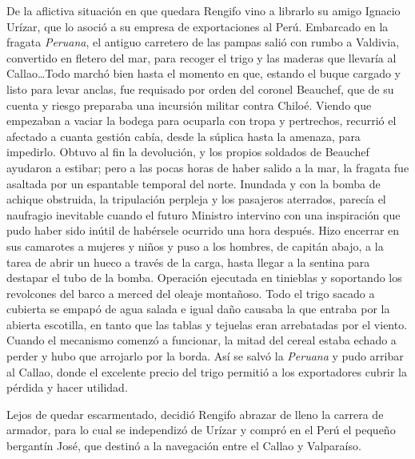 \documentclass[10pt,twoside,openright]{memoir}
\begin{document}
De la aflictiva situación en que quedara Rengifo vino a librarlo su
amigo Ignacio Urízar, que lo asoció a su empresa de exportaciones al
Perú. Embarcado en la fragata \emph{Peruana}, el antiguo carretero de
las pampas salió con rumbo a Valdivia, convertido en fletero del mar,
para recoger el trigo y las maderas que llevaría al Callao\ldots Todo
marchó bien hasta el momento en que, estando el buque cargado y listo
para levar anclas, fue requisado por orden del coronel Beauchef, que de
su cuenta y riesgo preparaba una incursión militar contra Chiloé. Viendo
que empezaban a vaciar la bodega para ocuparla con tropa y pertrechos,
recurrió el afectado a cuanta gestión cabía, desde la súplica hasta la
amenaza, para impedirlo. Obtuvo al fin la devolución, y los propios
soldados de Beauchef ayudaron a estibar; pero a las pocas horas de haber
salido a la mar, la fragata fue asaltada por un espantable temporal del
norte. Inundada y con la bomba de achique obstruida, la tripulación
perpleja y los pasajeros aterrados, parecía el naufragio inevitable
cuando el futuro Ministro intervino con una inspiración que pudo haber
sido inútil de habérsele ocurrido una hora después. Hizo encerrar en sus
camarotes a mujeres y niños y puso a los hombres, de capitán abajo, a la
tarea de abrir un hueco a través de la carga, hasta llegar a la sentina
para destapar el tubo de la bomba. Operación ejecutada en tinieblas y
soportando los revolcones del barco a merced del oleaje montañoso. Todo
el trigo sacado a cubierta se empapó de agua salada e igual daño causaba
la que entraba por la abierta escotilla, en tanto que las tablas y
tejuelas eran arrebatadas por el viento. Cuando el mecanismo comenzó a
funcionar, la mitad del cereal estaba echado a perder y hubo que
arrojarlo por la borda. Así se salvó la \emph{Peruana} y pudo arribar al
Callao, donde el excelente precio del trigo permitió a los exportadores
cubrir la pérdida y hacer utilidad.

Lejos de quedar escarmentado, decidió Rengifo abrazar de lleno la
carrera de armador, para lo cual se independizó de Urízar y compró en el
Perú el pequeño bergantín José, que destinó a la navegación entre el
Callao y Valparaíso.
\end{document}
